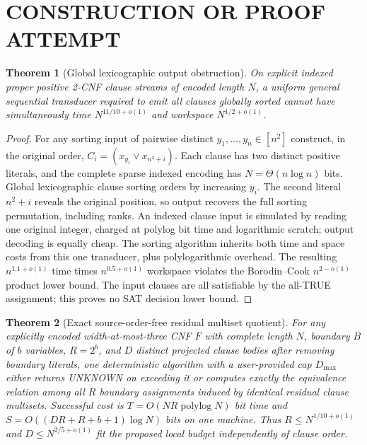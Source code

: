 \documentclass{article}
\newtheorem{theorem}{Theorem}
\begin{document}
\section{CONSTRUCTION OR PROOF ATTEMPT}
\begin{theorem}[Global lexicographic output obstruction]
On explicit indexed proper positive 2-CNF clause streams of encoded length $N$, a uniform general sequential transducer required to emit \emph{all clauses globally sorted} cannot have simultaneously time $N^{11/10+o(1)}$ and workspace $N^{1/2+o(1)}$.
\end{theorem}
\begin{proof}
For any sorting input of pairwise distinct $y_1,\ldots,y_n\in[n^2]$ construct, in the original order, $C_i=(x_{y_i}\lor x_{n^2+i})$. Each clause has two distinct positive literals, and the complete sparse indexed encoding has $N=\Theta(n\log n)$ bits. Global lexicographic clause sorting orders by increasing $y_i$. The second literal $n^2+i$ reveals the original position, so output recovers the full sorting permutation, including ranks. An indexed clause input is simulated by reading one original integer, charged at polylog bit time and logarithmic scratch; output decoding is equally cheap. The sorting algorithm inherits both time and space costs from this one transducer, plus polylogarithmic overhead. The resulting $n^{1.1+o(1)}$ time times $n^{0.5+o(1)}$ workspace violates the Borodin--Cook $n^{2-o(1)}$ product lower bound. The input clauses are all satisfiable by the all-TRUE assignment; this proves no SAT decision lower bound.
\end{proof}
\begin{theorem}[Exact source-order-free residual multiset quotient]
For any explicitly encoded width-at-most-three CNF $F$ with complete length $N$, boundary $B$ of $b$ variables, $R=2^b$, and $D$ distinct projected clause bodies after removing boundary literals, one deterministic algorithm with a user-provided cap $D_{\max}$ either returns UNKNOWN on exceeding it or computes exactly the equivalence relation among all $R$ boundary assignments induced by identical residual clause \emph{multisets}. Successful cost is $T=O(NR\operatorname{polylog}N)$ bit time and $S=O((DR+R+b+1)\log N)$ bits on one machine. Thus $R\le N^{1/10+o(1)}$ and $D\le N^{2/5+o(1)}$ fit the proposed local budget independently of clause order.
\end{theorem}
\end{document}
